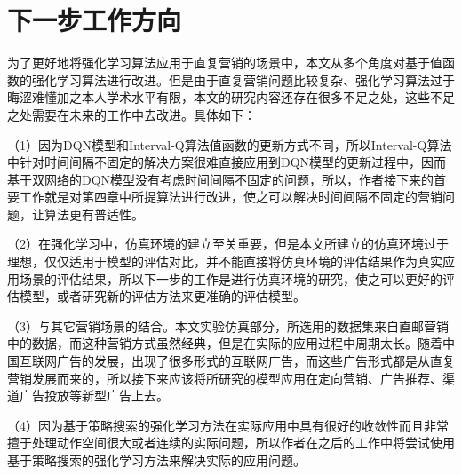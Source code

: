 \section{下一步工作方向}
 为了更好地将强化学习算法应用于直复营销的场景中，本文从多个角度对基于值函数的强化学习算法进行改进。但是由于直复营销问题比较复杂、强化学习算法过于晦涩难懂加之本人学术水平有限，本文的研究内容还存在很多不足之处，这些不足之处需要在未来的工作中去改进。具体如下：

 （1）因为DQN模型和Interval-Q算法值函数的更新方式不同，所以Interval-Q算法中针对时间间隔不固定的解决方案很难直接应用到DQN模型的更新过程中，因而基于双网络的DQN模型没有考虑时间间隔不固定的问题，所以，作者接下来的首要工作就是对第四章中所提算法进行改进，使之可以解决时间间隔不固定的营销问题，让算法更有普适性。

 （2）在强化学习中，仿真环境的建立至关重要，但是本文所建立的仿真环境过于理想，仅仅适用于模型的评估对比，并不能直接将仿真环境的评估结果作为真实应用场景的评估结果，所以下一步的工作是进行仿真环境的研究，使之可以更好的评估模型，或者研究新的评估方法来更准确的评估模型。

 （3）与其它营销场景的结合。本文实验仿真部分，所选用的数据集来自直邮营销中的数据，而这种营销方式虽然经典，但是在实际的应用过程中周期太长。随着中国互联网广告的发展，出现了很多形式的互联网广告，而这些广告形式都是从直复营销发展而来的，所以接下来应该将所研究的模型应用在定向营销、广告推荐、渠道广告投放等新型广告上去。

 （4）因为基于策略搜索的强化学习方法在实际应用中具有很好的收敛性而且非常擅于处理动作空间很大或者连续的实际问题，所以作者在之后的工作中将尝试使用基于策略搜索的强化学习方法来解决实际的应用问题。





